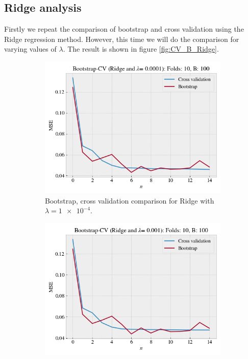 \documentclass[norsk,a4paper,12pt]{scrartcl}
\begin{document}
\newpage
\subsection{Ridge analysis }


Firstly we repeat the comparison of bootstrap and cross validation using the Ridge regression method. However, this time we will do the comparison for varying values of $\lambda$. The result is shown in figure \ref{fig:CV_B_Ridge}.
\begin{figure}[H]
     \centering
     \begin{subfigure}[b]{0.49\textwidth}
         \centering
         \includegraphics[width=\textwidth]{figures/CV_B_Ridge_0001.png}
         \caption{Bootstrap, cross validation comparison for Ridge with $\lambda = \num{1e-4}$.}
        \label{fig:CV_B_Ridge0001}
     \end{subfigure}
    \hfill
     \begin{subfigure}[b]{0.49\textwidth}
         \centering
         \includegraphics[width=\textwidth]{figures/CV_B_Ridge_001.png}

\end{subfigure}
\end{figure}
\end{document}
